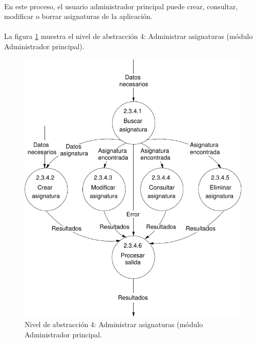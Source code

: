 \paragraph{}En este proceso, el usuario administrador principal puede crear,
consultar, modificar o borrar asignaturas de la aplicación.

\paragraph{}La figura \ref{diagramaNivel4-AdministrarAsignaturas}
muestra el nivel de abstracción 4: Administrar asignaturas (módulo Administrador
principal).

  \begin{figure}[!ht]
    \begin{center}
      \includegraphics[]{08.Analisis_Funcional/8.2.DFDs/Niveles/Nivel4/AdministradorPrincipal/AdministrarAsignaturas/Diagramas/nivel4-AdministrarAsignaturas.pdf}
      \caption{Nivel de abstracción 4: Administrar asignaturas (módulo Administrador principal.}
      \label{diagramaNivel4-AdministrarAsignaturas}
    \end{center}
  \end{figure}
